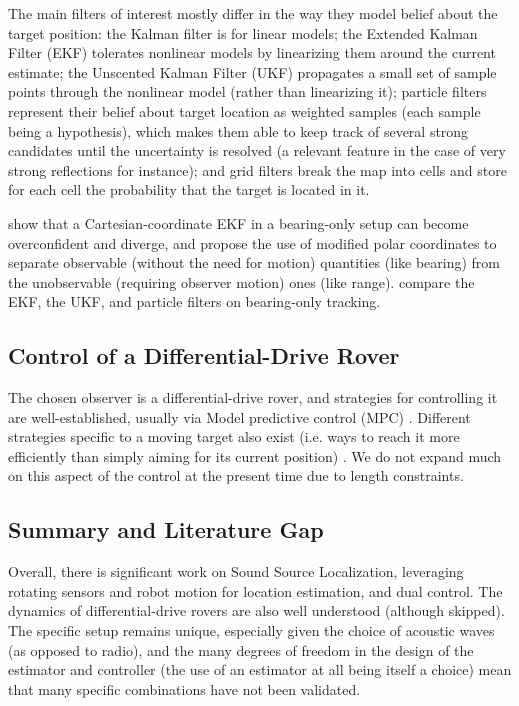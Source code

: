 The main filters of interest mostly differ in the way they model belief about the target position: the Kalman filter \citep{kalman1960new} is for linear models; the Extended Kalman Filter (EKF) tolerates nonlinear models by linearizing them around the current estimate; the Unscented Kalman Filter (UKF) \citep{julier2004unscented} propagates a small set of sample points through the nonlinear model (rather than linearizing it); particle filters \citep{gordon1993novel,arulampalam2002tutorial} represent their belief about target location as weighted samples (each sample being a hypothesis), which makes them able to keep track of several strong candidates until the uncertainty is resolved (a relevant feature in the case of very strong reflections for instance); and grid filters break the map into cells and store for each cell the probability that the target is located in it.

\citet{aidala1983utilization} show that a Cartesian-coordinate EKF in a bearing-only setup can become overconfident and diverge, and propose the use of modified polar coordinates to separate observable (without the need for motion) quantities (like bearing) from the unobservable (requiring observer motion) ones (like range). \citet{ristic2004beyond} compare the EKF, the UKF, and particle filters on bearing-only tracking.


\subsection{Control of a Differential-Drive Rover}
The chosen observer is a differential-drive rover, and strategies for controlling it are well-established, usually via Model predictive control (MPC)
\citep{mayne2000constrained,rawlings2017model}. Different strategies specific to a moving target also exist (i.e. ways to reach it more efficiently than simply aiming for its current position) \citep{zarchan2012tactical,deghat2014localization,shames2012circumnavigation}. We do not expand much on this aspect of the control at the present time due to length constraints.

\subsection{Summary and Literature Gap}
Overall, there is significant work on Sound Source Localization, leveraging rotating sensors and robot motion for location estimation, and dual control. The dynamics of differential-drive rovers are also well understood (although skipped). The specific setup remains unique, especially given the choice of acoustic waves (as opposed to radio), and the many degrees of freedom in the design of the estimator and controller (the use of an estimator at all being itself a choice) mean that many specific combinations have not been validated.


